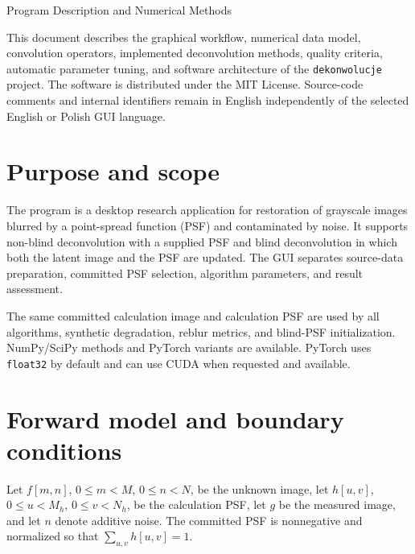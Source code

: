 \documentclass[10pt,a4paper]{article}
\newcommand{\code}[1]{\texttt{#1}}
\begin{document}
\begin{titlepage}\thispagestyle{empty}\centering
{}\vspace{4mm}
{\LARGE Program Description and Numerical Methods\par}\vspace{13mm}{\Large Version 0.108.0\par}
\vfill{}\vfill
\begin{minipage}{0.86\textwidth}\small
This document describes the graphical workflow, numerical data model, convolution operators, implemented deconvolution methods, quality criteria, automatic parameter tuning, and software architecture of the \code{dekonwolucje} project. The software is distributed under the MIT License. Source-code comments and internal identifiers remain in English independently of the selected English or Polish GUI language.
\end{minipage}\vspace{12mm}{\large August 2026\par}
\end{titlepage}
\tableofcontents\clearpage

\section{Purpose and scope}
The program is a desktop research application for restoration of grayscale images blurred by a point-spread function (PSF) and contaminated by noise. It supports non-blind deconvolution with a supplied PSF and blind deconvolution in which both the latent image and the PSF are updated. The GUI separates source-data preparation, committed PSF selection, algorithm parameters, and result assessment.

The same committed calculation image and calculation PSF are used by all algorithms, synthetic degradation, reblur metrics, and blind-PSF initialization. NumPy/SciPy methods and PyTorch variants are available. PyTorch uses \code{float32} by default and can use CUDA when requested and available.

\section{Forward model and boundary conditions}
Let $f[m,n]$, $0\leq m<M$, $0\leq n<N$, be the unknown image, let $h[u,v]$, $0\leq u<M_h$, $0\leq v<N_h$, be the calculation PSF, let $g$ be the measured image, and let $n$ denote additive noise. The committed PSF is nonnegative and normalized so that $\sum_{u,v}h[u,v]=1$.
\end{document}
